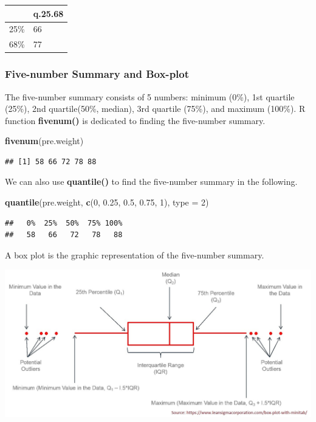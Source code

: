 \documentclass[
]{book}
\newenvironment{Shaded}{\begin{snugshade}}{\end{snugshade}}
\newcommand{\AttributeTok}[1]{\textcolor[rgb]{0.13,0.29,0.53}{#1}}
\newcommand{\DecValTok}[1]{\textcolor[rgb]{0.00,0.00,0.81}{#1}}
\newcommand{\FloatTok}[1]{\textcolor[rgb]{0.00,0.00,0.81}{#1}}
\newcommand{\FunctionTok}[1]{\textcolor[rgb]{0.13,0.29,0.53}{\textbf{#1}}}
\newcommand{\NormalTok}[1]{#1}
\begin{document}
\begin{tabular}{l|l}
\hline
  & q.25.68\\
\hline
25\% & 66\\
\hline
68\% & 77\\
\hline
\end{tabular}

\hypertarget{five-number-summary-and-box-plot}{%
\subsubsection{Five-number Summary and Box-plot}\label{five-number-summary-and-box-plot}}

The five-number summary consists of 5 numbers: minimum (0\%), 1st quartile (25\%), 2nd quartile(50\%, median), 3rd quartile (75\%), and maximum (100\%). R function \textbf{fivenum()} is dedicated to finding the five-number summary.

\begin{Shaded}
\begin{Highlighting}[]
\FunctionTok{fivenum}\NormalTok{(pre.weight)}
\end{Highlighting}
\end{Shaded}

\begin{verbatim}
## [1] 58 66 72 78 88
\end{verbatim}

We can also use \textbf{quantile()} to find the five-number summary in the following.

\begin{Shaded}
\begin{Highlighting}[]
\FunctionTok{quantile}\NormalTok{(pre.weight, }\FunctionTok{c}\NormalTok{(}\DecValTok{0}\NormalTok{, }\FloatTok{0.25}\NormalTok{, }\FloatTok{0.5}\NormalTok{, }\FloatTok{0.75}\NormalTok{, }\DecValTok{1}\NormalTok{), }\AttributeTok{type =} \DecValTok{2}\NormalTok{)}
\end{Highlighting}
\end{Shaded}

\begin{verbatim}
##   0%  25%  50%  75% 100% 
##   58   66   72   78   88
\end{verbatim}

A box plot is the graphic representation of the five-number summary.

\begin{center}\includegraphics[width=1\linewidth]{img03/w03-boxplot_explanation} \end{center}
\end{document}
